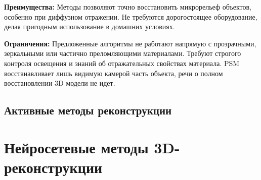 \textbf{Преимущества:} Методы позволяют точно восстановить микрорельеф объектов,
особенно при диффузном отражении. Не требуются дорогостоящее оборудование,
делая пригодным использование в домашних условиях.

\textbf{Ограничения:} Предложенные алгоритмы не работают напрямую с прозрачными,
зеркальными или частично преломляющими материалами. Требуют строгого контроля
освещения и знаний об отражательных свойствах материала. PSM восстанавливает
лишь видимую камерой часть объекта, речи о полном восстановлении 3D модели не идет.

\subsection{Активные методы реконструкции}

\section{Нейросетевые методы 3D-реконструкции}

